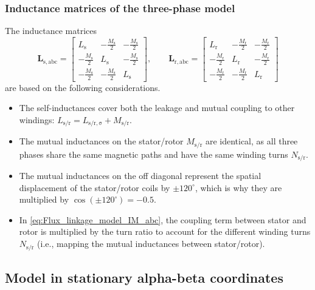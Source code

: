 \begin{frame}
	\frametitle{Inductance matrices of the three-phase model}
	The inductance matrices
	$$\renewcommand*{\arraystretch}{1.15}
		\bm{L}_\mathrm{s,abc} = \begin{bmatrix}
			L_\mathrm{s}            & -\frac{M_\mathrm{s}}{2} & -\frac{M_\mathrm{s}}{2} \\
			-\frac{M_\mathrm{s}}{2} & L_\mathrm{s}            & -\frac{M_\mathrm{s}}{2} \\
			-\frac{M_\mathrm{s}}{2} & -\frac{M_\mathrm{s}}{2} & L_\mathrm{s}
		\end{bmatrix}, \qquad  \bm{L}_\mathrm{r,abc} = \begin{bmatrix}
			L_\mathrm{r}            & -\frac{M_\mathrm{r}}{2} & -\frac{M_\mathrm{r}}{2} \\
			-\frac{M_\mathrm{r}}{2} & L_\mathrm{r}            & -\frac{M_\mathrm{r}}{2} \\
			-\frac{M_\mathrm{r}}{2} & -\frac{M_\mathrm{r}}{2} & L_\mathrm{r}
		\end{bmatrix}$$
	are based on the following considerations.
	\begin{itemize}
		\item The self-inductances cover both the leakage and mutual coupling to other windings: $L_\mathrm{s/r}=L_\mathrm{s/r, \sigma} + M_\mathrm{s/r}$.
		\item<2-> The mutual inductances on the stator/rotor $M_\mathrm{s/r}$ are identical, as all three phases share the same magnetic paths and have the same winding turns $N_\mathrm{s/r}$.
		\item<3-> The mutual inductances on the off diagonal represent the spatial displacement of the stator/rotor coils by $\pm 120^\circ$, which is why they are multiplied by $\cos(\pm 120^\circ)=-0.5$.
		\item<4-> In \eqref{eq:Flux_linkage_model_IM_abc}, the coupling term between stator and rotor is multiplied by the turn ratio to account for the different winding turns $N_\mathrm{s/r}$ (i.e., mapping the mutual inductances between stator/rotor).
	\end{itemize}
\end{frame}

\subsection{Model in stationary alpha-beta coordinates}

